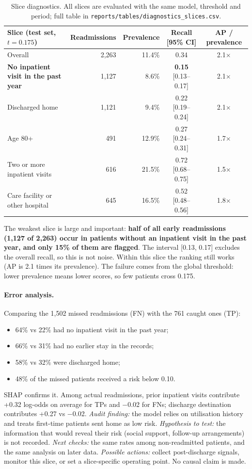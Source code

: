 \documentclass[11pt,a4paper]{article}
\newcommand{\code}[1]{\texttt{\small #1}}
\begin{document}
\begin{table}[H]
\centering\small
\begin{tabular}{lrrcc}
\toprule
Slice (test set, $t=0.175$) & Readmissions & Prevalence & Recall [95\% CI] & AP / prevalence \\
\midrule
Overall & 2{,}263 & 11.4\% & 0.34 & 2.1$\times$ \\
\textbf{No inpatient visit in the past year} & 1{,}127 & 8.6\% & \textbf{0.15} [0.13--0.17] & 2.1$\times$ \\
Discharged home & 1{,}121 & 9.4\% & 0.22 [0.19--0.24] & 2.1$\times$ \\
Age 80+ & 491 & 12.9\% & 0.27 [0.24--0.31] & 1.7$\times$ \\
Two or more inpatient visits & 616 & 21.5\% & 0.72 [0.68--0.75] & 1.5$\times$ \\
Care facility or other hospital & 645 & 16.5\% & 0.52 [0.48--0.56] & 1.8$\times$ \\
\bottomrule
\end{tabular}
\caption{Slice diagnostics. All slices are evaluated with the same model, threshold and period; full table in \code{reports/tables/diagnostics\_slices.csv}.}
\label{tab:slices}
\end{table}

The weakest slice is large and important: \textbf{half of all early readmissions (1{,}127 of 2{,}263) occur in patients without an inpatient visit in the past year, and only 15\% of them are flagged}. The interval [0.13, 0.17] excludes the overall recall, so this is not noise. Within this slice the ranking still works (AP is 2.1 times its prevalence). The failure comes from the global threshold: lower prevalence means lower scores, so few patients cross 0.175.

\paragraph{Error analysis.} Comparing the 1{,}502 missed readmissions (FN) with the 761 caught ones (TP):
\begin{itemize}
\item 64\% vs 22\% had no inpatient visit in the past year;
\item 66\% vs 31\% had no earlier stay in the records;
\item 58\% vs 32\% were discharged home;
\item 48\% of the missed patients received a risk below 0.10.
\end{itemize}
SHAP confirms it. Among actual readmissions, prior inpatient visits contribute +0.32 log-odds on average for TPs and $-$0.02 for FNs; discharge destination contributes +0.27 vs $-$0.02. \emph{Audit finding:} the model relies on utilisation history and treats first-time patients sent home as low risk. \emph{Hypothesis to test:} the information that would reveal their risk (social support, follow-up arrangements) is not recorded. \emph{Next checks:} the same rates among non-readmitted patients, and the same analysis on later data. \emph{Possible actions:} collect post-discharge signals, monitor this slice, or set a slice-specific operating point. No causal claim is made.
\end{document}
